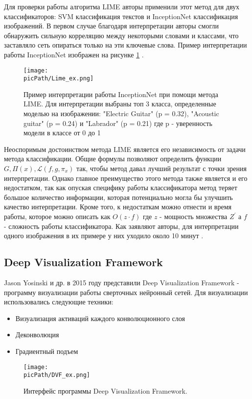 \documentclass[oneside,final,14pt]{extreport}
\newcommand{\picPath}{img}
\begin{document}
Для проверки работы алгоритма LIME авторы применили этот метод для двух классификаторов: SVM классификация текстов и InceptionNet  классификация изображений. В первом случае благодаря интерпретации авторы смогли обнаружить сильную корреляцию между некоторыми словами и классами, что заставляло сеть опираться только на эти ключевые слова. Пример интерпретации работы InceptionNet изображен на рисунке \ref{pic:LIME} .

\begin{figure}[H]
\begin{center}
\texttt{[image: \\picPath/Lime\_ex.png]}
\end{center}
  \caption{Пример интерпретации работы InceptionNet при помощи метода LIME. Для интерпретации выбраны топ 3 класса, определенные моделью на изображении: "Electric Guitar" (p = 0.32), "Acoustic guitar" (p = 0.24)  и "Labrador" (p = 0.21) где p - уверенность модели в классе от 0 до 1}
  \label{pic:LIME}
\end{figure}

Неоспоримым достоинством метода LIME является его независимость от задачи метода классификации. Общие формулы позволяют определить функции $G, \Pi(x), \mathcal{L}(f,g,\pi_x)$ так, чтобы метод давал лучший результат с точки зрения интерпретации. Однако главное преимущество этого метода также является и его недостатком, так как опуская специфику работы классификатора метод теряет большое количество информации, которая потенциально могла бы улучшить качество интерпретации. Кроме того, к недостаткам можно отнести и время работы, которое можно описать как $O(z\cdot f)$ где $z$ - мощность множества $Z^\prime$ а $f$  - сложность работы классификатора. Как заявляют авторы, для интерпретации одного изображения в их примере у них уходило около 10 минут \cite{1602.04938}.

\subsection{Deep Visualization Framework}
Jason Yosinski и др. в 2015 году представили Deep Visualization Framework\cite{bib:deepviz} - программу визуализации работы сверточных нейронный сетей. Для визуализации использовались следующие техники: 
\begin{itemize}
\item Визуализация активаций каждого конволюционного слоя
\item Деконволюция
\item Градиентный подъем
\end{itemize}
\begin{figure}[H]
\begin{center}
\texttt{[image: \\picPath/DVF\_ex.png]}
\end{center}
  \caption{Интерфейс программы Deep Visualization Framework.}
  \label{pic:DVF}
\end{figure}
\end{document}
